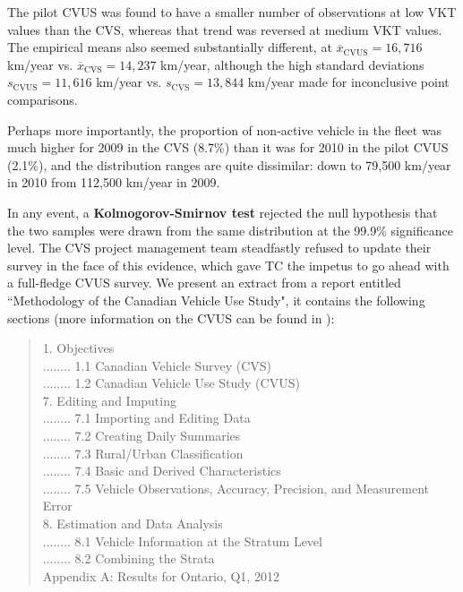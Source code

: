 \newl 
The pilot CVUS was found to have a smaller number of observations at low VKT values than the CVS, whereas that trend was reversed at medium VKT values. The empirical means also seemed substantially different, at $\overline{x}_{\textrm{CVUS}}=16,716$ km/year vs. $\overline{x}_{\textrm{CVS}}=14,237$ km/year, although the high standard deviations $s_{\textrm{CVUS}}=11,616$ km/year vs. $s_{\textrm{CVS}}=13,844$ km/year made for inconclusive point comparisons. \par Perhaps more importantly, the proportion of non-active vehicle in the fleet was much higher for 2009 in the CVS (8.7\%) than it was for 2010 in the pilot CVUS (2.1\%), and the distribution ranges are quite dissimilar: down  to 79,500 km/year in 2010 from 112,500 km/year in 2009. \par In any event, a \textbf{Kolmogorov-Smirnov test} rejected the null hypothesis that the two samples were drawn from the same distribution at the 99.9\% significance level. \newl The CVS project management team steadfastly refused to update their survey in the face of this evidence, which gave TC the impetus to go ahead with a full-fledge CVUS survey. \newpage\noindent We present an extract from a report entitled ``Methodology of the Canadian Vehicle Use Study", it contains the following sections (more information on the CVUS can be found in \cite{DC_CVUS}): 
\begin{quote}
1. Objectives\\
........ 1.1 Canadian Vehicle Survey (CVS)\\
........ 1.2 Canadian Vehicle Use Study (CVUS)\\
7. Editing and Imputing\\
........ 7.1 Importing and Editing Data\\
........ 7.2 Creating Daily Summaries\\
........ 7.3 Rural/Urban Classification\\
........ 7.4 Basic and Derived Characteristics\\
........ 7.5 Vehicle Observations, Accuracy, Precision, and Measurement Error\\
8. Estimation and Data Analysis\\
........ 8.1 Vehicle Information at the Stratum Level\\
........ 8.2 Combining the Strata\\
Appendix A: Results for Ontario, Q1, 2012
\end{quote}
